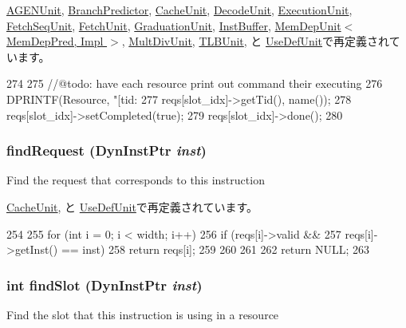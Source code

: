 \hyperlink{classAGENUnit_a7b7fff82f8c9cbdb02add1346f60bb9e}{AGENUnit}, \hyperlink{classBranchPredictor_a7b7fff82f8c9cbdb02add1346f60bb9e}{BranchPredictor}, \hyperlink{classCacheUnit_a7b7fff82f8c9cbdb02add1346f60bb9e}{CacheUnit}, \hyperlink{classDecodeUnit_a7b7fff82f8c9cbdb02add1346f60bb9e}{DecodeUnit}, \hyperlink{classExecutionUnit_a7b7fff82f8c9cbdb02add1346f60bb9e}{ExecutionUnit}, \hyperlink{classFetchSeqUnit_a7b7fff82f8c9cbdb02add1346f60bb9e}{FetchSeqUnit}, \hyperlink{classFetchUnit_a7b7fff82f8c9cbdb02add1346f60bb9e}{FetchUnit}, \hyperlink{classGraduationUnit_a7b7fff82f8c9cbdb02add1346f60bb9e}{GraduationUnit}, \hyperlink{classInstBuffer_a7b7fff82f8c9cbdb02add1346f60bb9e}{InstBuffer}, \hyperlink{classMemDepUnit_a74d7cd749b79186057ad86f5f7b79fd2}{MemDepUnit$<$ MemDepPred, Impl $>$}, \hyperlink{classMultDivUnit_a7b7fff82f8c9cbdb02add1346f60bb9e}{MultDivUnit}, \hyperlink{classTLBUnit_a7b7fff82f8c9cbdb02add1346f60bb9e}{TLBUnit}, と \hyperlink{classUseDefUnit_a7b7fff82f8c9cbdb02add1346f60bb9e}{UseDefUnit}で再定義されています。


\begin{DoxyCode}
274 {
275     //@todo: have each resource print out command their executing
276     DPRINTF(Resource, "[tid:%
277             reqs[slot_idx]->getTid(), name());
278     reqs[slot_idx]->setCompleted(true);
279     reqs[slot_idx]->done();
280 }
\end{DoxyCode}
\hypertarget{classResource_ae3afc1c63d17a49a6301bd18fca574a0}{
\subsubsection[{findRequest}]{ findRequest ({\bf DynInstPtr} {\em inst})}}
\label{classResource_ae3afc1c63d17a49a6301bd18fca574a0}
Find the request that corresponds to this instruction 

\hyperlink{classCacheUnit_ae3afc1c63d17a49a6301bd18fca574a0}{CacheUnit}, と \hyperlink{classUseDefUnit_ae3afc1c63d17a49a6301bd18fca574a0}{UseDefUnit}で再定義されています。


\begin{DoxyCode}
254 {
255     for (int i = 0; i < width; i++) {
256         if (reqs[i]->valid &&
257             reqs[i]->getInst() == inst) {
258             return reqs[i];
259         }
260     }
261 
262     return NULL;
263 }
\end{DoxyCode}
\hypertarget{classResource_a990f82d45376225d628def316f024f6b}{
\subsubsection[{findSlot}]{\setlength{\rightskip}{0pt plus 5cm}int findSlot ({\bf DynInstPtr} {\em inst})}}
\label{classResource_a990f82d45376225d628def316f024f6b}
Find the slot that this instruction is using in a resource 


